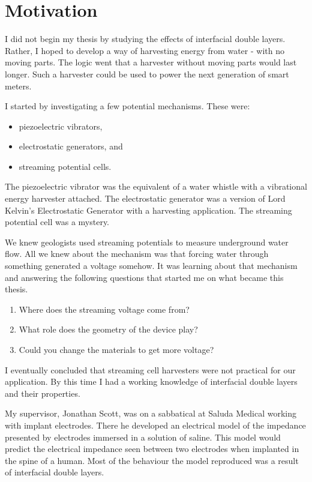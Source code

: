 
\section{Motivation}
I did not begin my thesis by studying the effects of interfacial double layers.
Rather, I hoped to develop a way of harvesting energy from water - with no moving parts.
The logic went that a harvester without moving parts would last longer.
Such a harvester could be used to power the next generation of smart meters.

I started by investigating a few potential mechanisms.
These were:
\begin{itemize}
\item piezoelectric vibrators,
\item electrostatic generators, and
\item streaming potential cells.
\end{itemize}

The piezoelectric vibrator was the equivalent of a water whistle with a vibrational energy harvester attached.
The electrostatic generator was a version of Lord Kelvin's Electrostatic Generator with a harvesting application.
The streaming potential cell was a mystery.

We knew geologists used streaming potentials to measure underground water flow.
All we knew about the mechanism was that forcing water through something generated a voltage somehow.
It was learning about that mechanism and answering the following questions that started me on what became this thesis.
\begin{enumerate}
\item Where does the streaming voltage come from?
\item What role does the geometry of the device play?
\item Could you change the materials to get more voltage?
\end{enumerate}
I eventually concluded that streaming cell harvesters were not practical for our application.
By this time I had a working knowledge of interfacial double layers and their properties.

My supervisor, Jonathan Scott, was on a sabbatical at Saluda Medical working with implant electrodes.
There he developed an electrical model of the impedance presented by electrodes immersed in a solution of saline.
This model would predict the electrical impedance seen between two electrodes when implanted in the spine of a human.
Most of the behaviour the model reproduced was a result of interfacial double layers.

